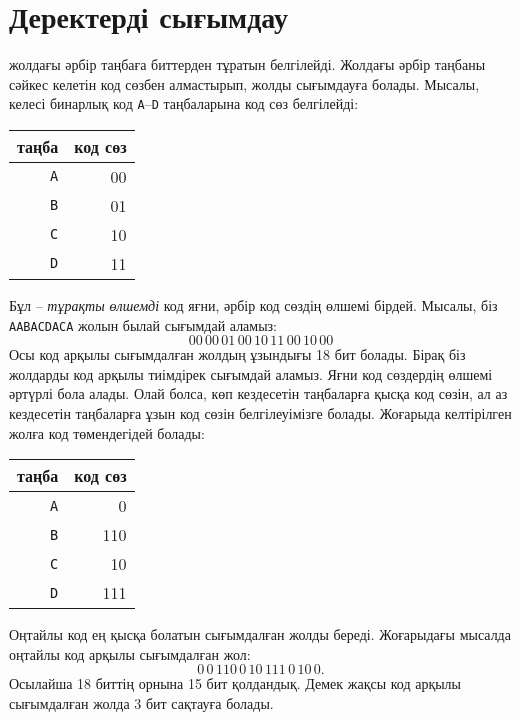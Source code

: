 \section{Деректерді сығымдау}


 жолдағы әрбір таңбаға 
биттерден тұратын  белгілейді.
Жолдағы әрбір таңбаны сәйкес келетін код сөзбен
алмастырып, жолды сығымдауға болады. Мысалы, 
келесі бинарлық код \texttt{A}–\texttt{D} таңбаларына 
код сөз белгілейді:
\begin{center}
\begin{tabular}{rr}
таңба & код сөз \\
\hline
\texttt{A} & 00 \\
\texttt{B} & 01 \\
\texttt{C} & 10 \\
\texttt{D} & 11 \\
\end{tabular}
\end{center}
Бұл -- \emph{тұрақты өлшемді} код
яғни, әрбір код сөздің өлшемі бірдей.
Мысалы, біз \texttt{AABACDACA} жолын
былай сығымдай аламыз:
\[00\,00\,01\,00\,10\,11\,00\,10\,00\]
Осы код арқылы сығымдалған жолдың ұзындығы 
18 бит болады.
Бірақ біз жолдарды  код 
арқылы тиімдірек сығымдай аламыз. Яғни
код сөздердің өлшемі әртүрлі бола алады. %
Олай болса, көп кездесетін таңбаларға қысқа код
сөзін, ал аз кездесетін таңбаларға ұзын код сөзін
белгілеуімізге болады.
Жоғарыда келтірілген жолға  код төмендегідей  болады:
\begin{center}
\begin{tabular}{rr}
таңба & код сөз \\
\hline
\texttt{A} & 0 \\
\texttt{B} & 110 \\
\texttt{C} & 10 \\
\texttt{D} & 111 \\
\end{tabular}
\end{center}
Оңтайлы код ең қысқа болатын сығымдалған 
жолды береді. 
Жоғарыдағы мысалда оңтайлы код арқылы 
сығымдалған жол:
\[0\,0\,110\,0\,10\,111\,0\,10\,0.\]
Осылайша 18 биттің орнына 15 бит қолдандық. 
Демек жақсы код арқылы сығымдалған жолда 
3 бит сақтауға болады.  

